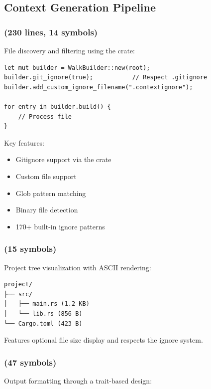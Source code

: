 \subsection{Context Generation Pipeline}

\subsubsection{ (230 lines, 14 symbols)}

File discovery and filtering using the  crate:

\begin{lstlisting}[style=rustcode, caption={File walker configuration}]
let mut builder = WalkBuilder::new(root);
builder.git_ignore(true);           // Respect .gitignore
builder.add_custom_ignore_filename(".contextignore");

for entry in builder.build() {
    // Process file
}
\end{lstlisting}

Key features:
\begin{itemize}
    \item Gitignore support via the  crate
    \item Custom  file support
    \item Glob pattern matching
    \item Binary file detection
    \item 170+ built-in ignore patterns
\end{itemize}

\subsubsection{ (15 symbols)}

Project tree visualization with ASCII rendering:

\begin{verbatim}
project/
├── src/
│   ├── main.rs (1.2 KB)
│   └── lib.rs (856 B)
└── Cargo.toml (423 B)
\end{verbatim}

Features optional file size display and respects the ignore system.

\subsubsection{ (47 symbols)}

Output formatting through a trait-based design:

